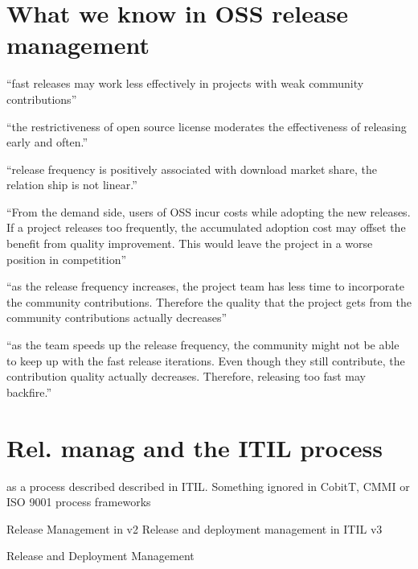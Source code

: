     
 
 \section{What we know in OSS release management}
 
 
 ``fast releases may work less effectively in projects with weak community contributions'' \citep{ChenKrishnan_et_al2013}
 
 ``the restrictiveness  of  open  source  license  moderates  the  effectiveness of releasing  early and often.''  \citep{ChenKrishnan_et_al2013}
 
 ``release  frequency  is  positively associated with download market share, the relation ship is not linear.'' \citep{ChenKrishnan_et_al2013}
 
 
 
    
    ``From  the  demand  side,  users  of  OSS  incur  costs  while  adopting  the  new  releases.  If  a  project  releases  too 
frequently,  the  accumulated  adoption  cost  may  offset  the  benefit  from  quality  improvement.  This 
would leave the project in a worse position in competition'' \citep{ChenKrishnan_et_al2013}

 
``as the release frequency  increases,  the  project  team  has  less  time to  incorporate  the  community  contributions. 
Therefore the quality that the project gets from the community contributions actually decreases'' \citep{ChenKrishnan_et_al2013}

``as  the  team  speeds  up  the  release  frequency,  the  community 
might  not  be  able  to  keep  up  with  the  fast  release 
iterations.  Even  though  they  still  contribute,  the 
contribution quality actually decreases. Therefore, releasing too fast may backfire.'' \citep{ChenKrishnan_et_al2013}




 
 \section{Rel. manag and the  ITIL process}

 \citet{CaterSteelTan_et_al2006} as a process described described in ITIL.  Something ignored in CobitT, CMMI or ISO 9001 process frameworks
 
 
 Release Management in v2
 Release  and deployment  management in ITIL v3 
 
  Release and Deployment Management

